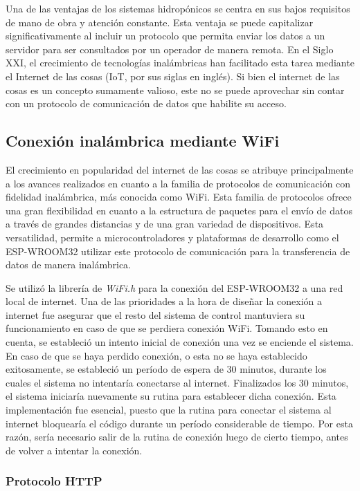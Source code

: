 Una de las ventajas de los sistemas hidropónicos se centra en sus bajos requisitos de mano de obra y atención constante. Esta ventaja se puede capitalizar significativamente al incluir un protocolo que permita enviar los datos a un servidor para ser consultados por un operador de manera remota. En el Siglo XXI, el crecimiento de tecnologías inalámbricas han facilitado esta tarea mediante el Internet de las cosas (IoT, por sus siglas en inglés). Si bien el internet de las cosas es un concepto sumamente valioso, este no se puede aprovechar sin contar con un protocolo de comunicación de datos que habilite su acceso.

\subsection{Conexión inalámbrica mediante WiFi}

El crecimiento en popularidad del internet de las cosas se atribuye principalmente a los avances realizados en cuanto a la familia de protocolos de comunicación con fidelidad inalámbrica, más conocida como WiFi. \cite{biber} Esta familia de protocolos ofrece una gran flexibilidad en cuanto a la estructura de paquetes para el envío de datos a través de grandes distancias y de una gran variedad de dispositivos. Esta versatilidad, permite a microcontroladores y plataformas de desarrollo como el ESP-WROOM32 utilizar este protocolo de comunicación para la transferencia de datos de manera inalámbrica.

Se utilizó la librería de \textit{WiFi.h} para la conexión del ESP-WROOM32 a una red local de internet. Una de las prioridades a la hora de diseñar la conexión a internet fue asegurar que el resto del sistema de control mantuviera su funcionamiento en caso de que se perdiera conexión WiFi. Tomando esto en cuenta, se estableció un intento inicial de conexión una vez se enciende el sistema. En caso de que se haya perdido conexión, o esta no se haya establecido exitosamente, se estableció un período de espera de 30 minutos, durante los cuales el sistema no intentaría conectarse al internet. Finalizados los 30 minutos, el sistema iniciaría nuevamente su rutina para establecer dicha conexión. Esta implementación fue esencial, puesto que la rutina para conectar el sistema al internet bloquearía el código durante un período considerable de tiempo. Por esta razón, sería necesario salir de la rutina de conexión luego de cierto tiempo, antes de volver a intentar la conexión.

\subsubsection{Protocolo HTTP}

